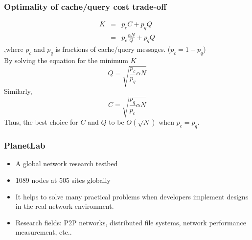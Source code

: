 \documentclass[red]{beamer}
\begin{document}
\begin{frame}
\frametitle{Optimality of cache/query cost trade-off}
\begin{eqnarray}
K &=& p_cC+p_qQ\\
  &=& p_c\frac{\alpha N}{Q} + p_q Q
\end{eqnarray}
,where $p_c$ and $p_q$ is fractions of cache/query messages. ($p_c = 1 - p_q$)\\
By solving the equation for the minimum $K$
\begin{equation}\label{eq:c_cost}
Q = \sqrt{\frac{p_c}{p_q}\alpha N}
\end{equation} 
Similarly, 
\begin{equation}\label{eq:q_cost}
C = \sqrt{\frac{p_q}{p_c}\alpha N}
\end{equation}
Thus, the best choice for $C$ and $Q$ to be $O(\sqrt{N})$ when $p_c=p_q$. 
\end{frame}

\begin{frame}
\frametitle{PlanetLab}
\begin{itemize}
\item A global network research testbed
\item 1089 nodes at 505 sites globally
\item It helps to solve many practical problems when developers implement designs in the real network environment.
\item Research fields: P2P networks, distributed file systems, network performance measurement, etc..
\end{itemize}
\end{frame}
\end{document}
